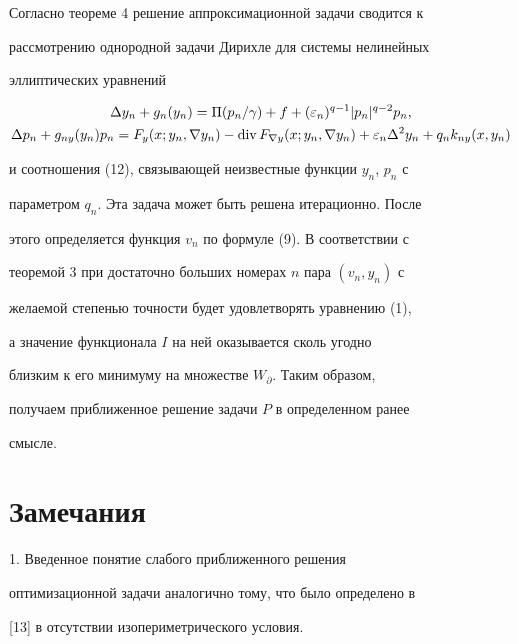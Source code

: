  


Согласно теореме 4 решение аппроксимационной задачи сводится к 


рассмотрению однородной задачи Дирихле для системы нелинейных 


эллиптических уравнений 


\begin{gather*} 


\Delta y_n+g_n(y_n)=\Pi(p_n/\gamma)+f+(\varepsilon_n)^{q-1} 


|p_n|^{q-2}p_n,\\ 


\Delta p_n+g_{ny}(y_n)p_n=F_y(x;y_n,\nabla y_n)-\Div 


F_{\nabla y}(x;y_n,\nabla y_n)+\varepsilon_n\Delta^2y_n+ 


q_n k_{ny}(x,y_n) 


\end{gather*} 


и соотношения (12), связывающей неизвестные функции $y_n$, $p_n$ с 


параметром $q_n$. Эта задача может быть решена итерационно. После 


этого определяется функция $v_n$ по формуле (9). В соответствии с 


теоремой 3 при достаточно больших номерах $n$ пара $(v_n,y_n)$ с 


желаемой степенью точности будет удовлетворять уравнению (1), 


а значение функционала $I$ на ней оказывается сколь угодно 


близким к его минимуму на множестве $W_\partial$. Таким образом, 


получаем приближенное решение задачи $P$ в определенном ранее 


смысле. 


 


 


\section{Замечания} 


 


1. Введенное понятие слабого приближенного решения 


оптимизационной задачи аналогично тому, что было определено в 


[13] в отсутствии изопериметрического условия. 


